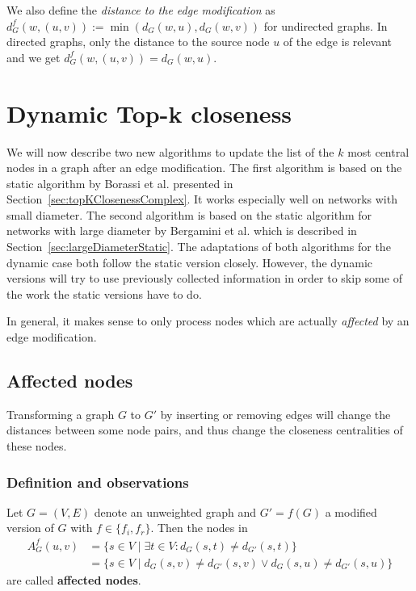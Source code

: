 We also define the \emph{distance to the edge modification} as $d_G^f(w, (u, v)) := \min{(d_G(w, u), d_G(w, v))}$ for undirected graphs. In directed graphs, only the distance to the source node $u$ of the edge is relevant and we get $d_G^f(w, (u, v)) = d_G(w, u)$.


\section{Dynamic Top-k closeness}
We will now describe two new algorithms to update the list of the $k$ most central nodes in a graph after an edge modification. The first algorithm is based on the static algorithm by Borassi et al. presented in Section~\ref{sec:topKClosenessComplex}. It works especially well on networks with small diameter. The second algorithm is based on the static algorithm for networks with large diameter by Bergamini et al. which is described in Section~\ref{sec:largeDiameterStatic}. The adaptations of both algorithms for the dynamic case both follow the static version closely. However, the dynamic versions will try to use previously collected information in order to skip some of the work the static versions have to do.

In general, it makes sense to only process nodes which are actually \emph{affected} by an edge modification. 

\subsection{Affected nodes}

Transforming a graph $G$ to $G'$ by inserting or removing edges will change the distances between some node pairs, and thus change the closeness centralities of these nodes.

\subsubsection{Definition and observations}

\begin{definition}
\label{def:affectedNodes}
	Let $G = (V, E)$ denote an unweighted graph and $G' = f(G)$ a modified version of $G$ with $f \in \{f_i, f_r\}$. Then the nodes in 
	\begin{align}
		A_G^f(u, v) &= \{s \in V \mid \exists t \in V : d_G(s,t) \neq d_{G'}(s, t)\} \label{eq:affectedNodesGeneral} \\
		            &=\{s \in V \mid d_G(s, v) \neq d_{G'}(s, v) \lor d_G(s, u) \neq d_{G'}(s, u)\} \label{eq:affectedNodesSimplified}
	\end{align} are called \textbf{affected nodes}.
\end{definition}
 
